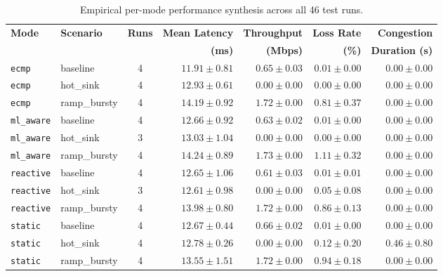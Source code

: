 \begin{table}[H]
  \centering
  \small
  \caption{Empirical per-mode performance synthesis across all 46 test runs.}
  \label{tab:scenario_aggregate}
  \begin{tabularx}{\textwidth}{l X c r r r r}
    \toprule
    \textbf{Mode} & \textbf{Scenario} & \textbf{Runs} & \textbf{Mean Latency} & \textbf{Throughput} & \textbf{Loss Rate} & \textbf{Congestion} \\
    & & & \textbf{(ms)} & \textbf{(Mbps)} & \textbf{(\%)} & \textbf{Duration (s)} \\
    \midrule
    \texttt{ecmp} & baseline & 4 & $11.91 \pm 0.81$ & $0.65 \pm 0.03$ & $0.01 \pm 0.00$ & $0.00 \pm 0.00$ \\
    \texttt{ecmp} & hot\_sink & 4 & $12.93 \pm 0.61$ & $0.00 \pm 0.00$ & $0.00 \pm 0.00$ & $0.00 \pm 0.00$ \\
    \texttt{ecmp} & ramp\_bursty & 4 & $14.19 \pm 0.92$ & $1.72 \pm 0.00$ & $0.81 \pm 0.37$ & $0.00 \pm 0.00$ \\
    \midrule
    \texttt{ml\_aware} & baseline & 4 & $12.66 \pm 0.92$ & $0.63 \pm 0.02$ & $0.01 \pm 0.00$ & $0.00 \pm 0.00$ \\
    \texttt{ml\_aware} & hot\_sink & 3 & $13.03 \pm 1.04$ & $0.00 \pm 0.00$ & $0.00 \pm 0.00$ & $0.00 \pm 0.00$ \\
    \texttt{ml\_aware} & ramp\_bursty & 4 & $14.24 \pm 0.89$ & $\mathbf{1.73 \pm 0.00}$ & $1.11 \pm 0.32$ & $0.00 \pm 0.00$ \\
    \midrule
    \texttt{reactive} & baseline & 4 & $12.65 \pm 1.06$ & $0.61 \pm 0.03$ & $0.01 \pm 0.01$ & $0.00 \pm 0.00$ \\
    \texttt{reactive} & hot\_sink & 3 & $12.61 \pm 0.98$ & $0.00 \pm 0.00$ & $0.05 \pm 0.08$ & $0.00 \pm 0.00$ \\
    \texttt{reactive} & ramp\_bursty & 4 & $13.98 \pm 0.80$ & $1.72 \pm 0.00$ & $0.86 \pm 0.13$ & $0.00 \pm 0.00$ \\
    \midrule
    \texttt{static} & baseline & 4 & $12.67 \pm 0.44$ & $0.66 \pm 0.02$ & $0.01 \pm 0.00$ & $0.00 \pm 0.00$ \\
    \texttt{static} & hot\_sink & 4 & $12.78 \pm 0.26$ & $0.00 \pm 0.00$ & $0.12 \pm 0.20$ & $0.46 \pm 0.80$ \\
    \texttt{static} & ramp\_bursty & 4 & $13.55 \pm 1.51$ & $1.72 \pm 0.00$ & $0.94 \pm 0.18$ & $0.00 \pm 0.00$ \\
    \bottomrule
  \end{tabularx}
\end{table}

